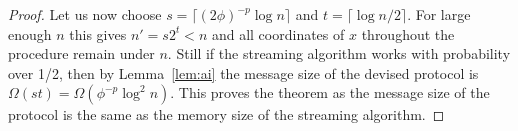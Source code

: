 \begin{proof}
Let us now choose $s=\lceil(2\phi)^{-p}\log n\rceil$ and $t=\lceil\log
n/2\rceil$. For large enough $n$ this gives $n'=s2^t<n$ and all coordinates of
$x$ throughout the procedure remain under $n$. Still if the streaming
algorithm works with probability over 1/2, then  by Lemma~\ref{lem:ai} the message
size of the devised protocol is $\Omega(st)=\Omega(\phi^{-p}\log^2n)$. This
proves the theorem as the message size of the protocol is the same as the
memory size of the streaming algorithm.
\end{proof}
